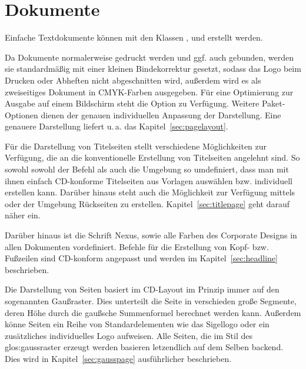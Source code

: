 \chapter{Dokumente}

Einfache Textdokumente können mit den Klassen ,
 und  erstellt werden.


Da Dokumente normalerweise gedruckt werden und ggf. auch gebunden, werden
sie standardmäßig mit einer kleinen Bindekorrektur gesetzt, sodass das
Logo beim Drucken oder Abheften nicht abgeschnitten wird, außerdem wird
es als zweiseitiges Dokument in CMYK-Farben ausgegeben.
Für eine Optimierung zur Ausgabe auf einem Bildschirm steht die Option
 zu Verfügung. Weitere Paket-Optionen dienen der
genauen individuellen Anpassung der Darstellung. Eine genauere Darstellung
liefert \mbox{u.\,a.}\xspace das Kapitel~\ref{sec:pagelayout}.

Für die Darstellung von Titelseiten stellt \tubslatex verschiedene Möglichkeiten
zur Verfügung, die an die konventionelle Erstellung von Titelseiten angelehnt
sind. So sowohl sowohl der Befehl  als auch die Umgebung
 so umdefiniert, dass man mit ihnen einfach CD-konforme
Titelseiten aus Vorlagen auswählen bzw. individuell erstellen kann.
Darüber hinaus steht auch die Möglichkeit zur Verfügung mittels
 oder der Umgebung 
Rückseiten zu erstellen. Kapitel~\ref{sec:titlepage} geht darauf näher ein.

Darüber hinaus ist die Schrift Nexus, sowie alle Farben des Corporate Designs
in allen Dokumenten vordefiniert.
Befehle für die Erstellung von Kopf- bzw. Fußzeilen sind CD-konform angepasst und
werden im Kapitel~\ref{sec:headline} beschrieben.

Die Darstellung von Seiten basiert im CD-Layout im Prinzip immer auf den
sogenannten Gaußraster. Dies unterteilt die Seite in verschieden große
Segmente, deren Höhe durch die gaußsche Summenformel berechnet werden kann.
Außerdem könne Seiten ein Reihe von Standardelementen wie das Sigellogo oder
ein zusätzliches individuelles Logo aufweisen.
Alle Seiten, die im Stil des \gls{glos:gaussraster} erzeugt werden basieren letzendlich
auf dem Selben backend. Dies wird in Kapitel~\ref{sec:gausspage} ausführlicher
beschrieben.


